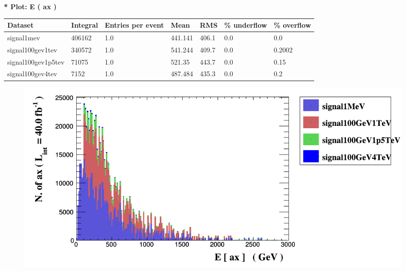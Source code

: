 \documentclass[a4paper, 10pt]{article}
\begin{document}
\textbf{* Plot: E ( ax ) }\\
   \begin{table}[H]
  \begin{center}
    \begin{tabular}{|m{23.0mm}|m{23.0mm}|m{18.0mm}|m{19.0mm}|m{19.0mm}|m{19.0mm}|m{19.0mm}|}
      \hline
      {\cellcolor{yellow}         Dataset}& {\cellcolor{yellow}         Integral}& {\cellcolor{yellow}         Entries per event}& {\cellcolor{yellow}         Mean}& {\cellcolor{yellow}         RMS}& {\cellcolor{yellow}         \% underflow}& {\cellcolor{yellow}         \% overflow}\\
      \hline
      {\cellcolor{white}         signal1mev}& {\cellcolor{white}         406162}& {\cellcolor{white}         1.0}& {\cellcolor{white}         441.141}& {\cellcolor{white}         406.1}& {\cellcolor{green}         0.0}& {\cellcolor{green}         0.0}\\
      \hline
      {\cellcolor{white}         signal100gev1tev}& {\cellcolor{white}         340572}& {\cellcolor{white}         1.0}& {\cellcolor{white}         541.244}& {\cellcolor{white}         409.7}& {\cellcolor{green}         0.0}& {\cellcolor{green}         0.2002}\\
      \hline
      {\cellcolor{white}         signal100gev1p5tev}& {\cellcolor{white}         71075}& {\cellcolor{white}         1.0}& {\cellcolor{white}         521.35}& {\cellcolor{white}         443.7}& {\cellcolor{green}         0.0}& {\cellcolor{green}         0.15}\\
      \hline
      {\cellcolor{white}         signal100gev4tev}& {\cellcolor{white}         7152}& {\cellcolor{white}         1.0}& {\cellcolor{white}         487.484}& {\cellcolor{white}         435.3}& {\cellcolor{green}         0.0}& {\cellcolor{green}         0.2}\\
\hline
    \end{tabular}
  \end{center}
\end{table}

\begin{figure}[H]
  \begin{center}
    \includegraphics[scale=0.45]{selection_0.png}\\
\caption{   }
  \end{center}
\end{figure}
      \newpage
\end{document}
